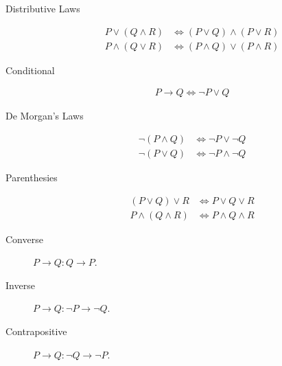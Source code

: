 \documentclass[../main.tex]{subfiles}
\begin{document}
\begin{description}
  \item[Distributive Laws]
    \begin{align}
      P\vee\left(Q\wedge R\right) &\iff \left(P\vee Q\right)\wedge\left(P\vee
      R\right)\\
      P\wedge\left(Q\vee R\right) &\iff \left(P\wedge Q\right)\vee\left(P\wedge
      R\right)
    \end{align}
  \item[Conditional]
    \begin{align}
       P \to Q \iff \neg P \vee Q
    \end{align}
  \item[De Morgan's Laws]
    \begin{align}
      \neg\left(P\wedge Q\right) &\iff \neg P \vee \neg Q\\
      \neg\left(P\vee Q\right) &\iff \neg P \wedge \neg Q
    \end{align}
  \item[Parenthesies]
    \begin{align}
      \left(P \vee Q\right)\vee R &\iff P\vee Q\vee R\\
      P\wedge \left(Q\wedge R\right) &\iff P\wedge Q\wedge R
    \end{align}
  \item[Converse] $P\to Q : Q\to P$.
  \item[Inverse] $P\to Q : \neg P \to \neg Q$.
  \item[Contrapositive] $P\to Q : \neg Q \to \neg P$.
\end{description}
\end{document}
